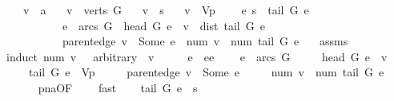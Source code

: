 \begin{isabellebody}
\ \ \ v\ {\isacharcolon}{\isacharcolon}\ {\isacharprime}a\isanewline
\ \ \ {\isachardoublequoteopen}v\ {\isasymin}\ verts\ G{\isachardoublequoteclose}\isanewline
\ \ \ {\isachardoublequoteopen}v\ {\isasymnoteq}\ s{\isachardoublequoteclose}\isanewline
\ \ \ {\isachardoublequoteopen}v\ {\isasymnotin}\ V\isactrlsub p{\isachardoublequoteclose}\isanewline
\ \ \ \ {\isachardoublequoteopen}{\isasymexists}e{\isachardot}\ s\ {\isasymrightarrow}\isactrlsup {\isacharasterisk}\ tail\ G\ e\ {\isasymand}\isanewline
\ \ \ \ \ \ \ \ \ \ e\ {\isasymin}\ arcs\ G\ {\isasymand}\ head\ G\ e\ {\isacharequal}\ v\ {\isasymand}\ dist\ {\isacharparenleft}tail\ G\ e{\isacharparenright}\ {\isasymnoteq}\ {\isasyminfinity}\ {\isasymand}\isanewline
\ \ \ \ \ \ \ \ \ \ parent{\isacharunderscore}edge\ v\ {\isacharequal}\ Some\ e\ {\isasymand}\ num\ v\ {\isacharequal}\ num\ {\isacharparenleft}tail\ G\ e{\isacharparenright}\ {\isacharplus}\ {}{\isachardoublequoteclose}\isanewline
%
\isadelimproof
%
\endisadelimproof
%
\isatagproof
{}\isamarkupfalse%
\ assms\isanewline
{}\isamarkupfalse%
{\isacharparenleft}induct\ {\isachardoublequoteopen}num\ v\ {\isacharminus}\ {}{\isachardoublequoteclose}\ arbitrary\ {\isacharcolon}\ v{\isacharparenright}\isanewline
{}\isamarkupfalse%
\ {}\isanewline
\ \ \isamarkupfalse%
\ e\ \ ee{\isacharcolon}\isanewline
\ \ \ \ {\isachardoublequoteopen}e\ {\isasymin}\ arcs\ G{\isachardoublequoteclose}\ \isanewline
\ \ \ \ {\isachardoublequoteopen}head\ G\ e\ {\isacharequal}\ v{\isachardoublequoteclose}\ \isanewline
\ \ \ \ {\isachardoublequoteopen}{\isacharparenleft}tail\ G\ e{\isacharparenright}\ {\isasymnotin}\ V\isactrlsub p{\isachardoublequoteclose}\ \isanewline
\ \ \ \ {\isachardoublequoteopen}parent{\isacharunderscore}edge\ v\ {\isacharequal}\ Some\ e{\isachardoublequoteclose}\ \isanewline
\ \ \ \ {\isachardoublequoteopen}num\ v\ {\isacharequal}\ num\ {\isacharparenleft}tail\ G\ e{\isacharparenright}\ {\isacharplus}\ {}{\isachardoublequoteclose}\isanewline
\ \ \ \ \isamarkupfalse%
\ pna{\isacharbrackleft}OF\ {}{\isacharparenleft}{}{\isacharminus}{}{\isacharparenright}{\isacharbrackright}\ \ \isamarkupfalse%
\ fast\isanewline
\ \ \isamarkupfalse%
\ {\isachardoublequoteopen}tail\ G\ e\ {\isacharequal}\ s{\isachardoublequoteclose}\ \isanewline
\ \ \ \ \isamarkupfalse%

\end{isabellebody}
